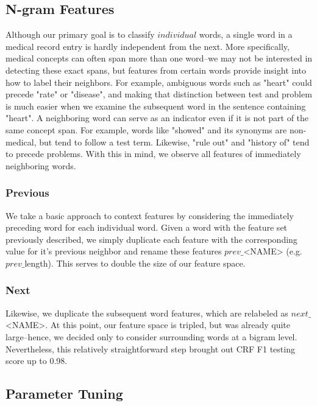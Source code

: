 \documentclass[preprint]{style}
\begin{document}
\subsection{N-gram Features}
Although our primary goal is to classify $individual$ words, a single word in a medical record entry is hardly independent from the next.  More specifically, medical concepts can often span more than one word--we may not be interested in detecting these exact spans, but features from certain words provide insight into how to label their neighbors. For example, ambiguous words such as "heart" could precede "rate" or "disease", and making that distinction between test and problem is much easier when we examine the subsequent word in the sentence containing "heart". A neighboring word can serve as an indicator even if it is not part of the same concept span. For example, words like "showed" and its synonyms are non-medical, but tend to follow a test term. Likewise, "rule out" and "history of" tend to precede problems. With this in mind, we observe all features of immediately neighboring words. 

\subsubsection{Previous}
We take a basic approach to context features by considering the immediately preceding word for each individual word. Given a word with the feature set previously described, we simply duplicate each feature with the corresponding value for it's previous neighbor and rename these features $prev\_$<NAME> (e.g. $prev\_$length).  This serves to double the size of our feature space.
\subsubsection{Next}
Likewise, we duplicate the subsequent word features, which are relabeled as $next\_$<NAME>. At this point, our feature space is tripled, but was already quite large--hence, we decided only to consider surrounding words at a bigram level. Nevertheless, this relatively straightforward step brought out CRF F1 testing score up to 0.98.

\subsection{Parameter Tuning}
\end{document}
